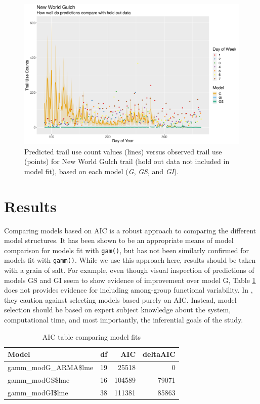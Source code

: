 \documentclass[
]{book}
\begin{document}
\begin{figure}

{\centering \includegraphics[width=1\linewidth]{../figures/NWG_pred_compare} 

}

\caption{Predicted trail use count values (lines) versus observed trail use (points) for New World Gulch trail (hold out data not included in model fit), based on each model (\emph{G}, \emph{GS}, and \emph{GI}).}\label{fig:NWG-pred}
\end{figure}

\hypertarget{results}{%
\section{Results}\label{results}}

Comparing models based on AIC is a robust approach to comparing the different model structures. It has been shown to be an appropriate means of model comparison for models fit with \texttt{gam()}, but has not been similarly confirmed for models fit with \texttt{gamm()}. While we use this approach here, results should be taken with a grain of salt. For example, even though visual inspection of predictions of models GS and GI seem to show evidence of improvement over model G, Table \ref{tab:AICkable} does not provides evidence for including among-group functional variability. In \citet{pedersen2019hierarchical}, they caution against selecting models based purely on AIC. Instead, model selection should be based on expert subject knowledge about the system, computational time, and most importantly, the inferential goals of the study.

\begin{table}

\caption{\label{tab:AICkable}AIC table comparing model fits}
\centering
\begin{tabular}[t]{lrrr}
\toprule
Model & df & AIC & deltaAIC\\
\midrule
gamm\_modG\_ARMA\$lme & 19 & 25518 & 0\\
gamm\_modGS\$lme & 16 & 104589 & 79071\\
gamm\_modGI\$lme & 38 & 111381 & 85863\\
\bottomrule
\end{tabular}
\end{table}
\end{document}
